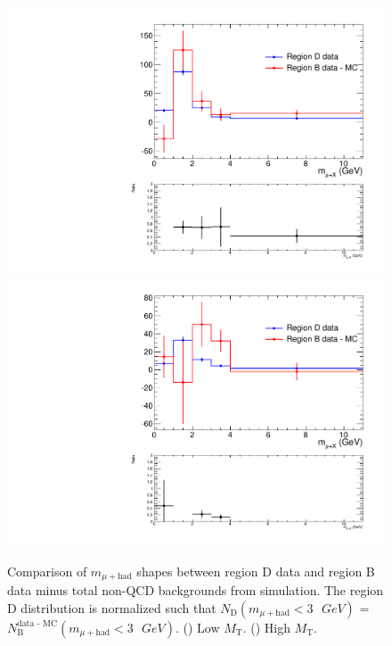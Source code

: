 \begin{figure}[hbtp]
  \begin{center}
    \includegraphics[width=\cmsFigWidth]{figures/muHadMassCanvas_regBDataMinusMCVsRegDData_lowMT}
    \includegraphics[width=\cmsFigWidth]{figures/muHadMassCanvas_regBDataMinusMCVsRegDData_highMT}
    \caption{Comparison of $m_{\mu+{\text{had}}}$ shapes between region D data and region B data minus total non-QCD backgrounds from simulation.  The region D distribution is normalized such that $N_{\text{D}}(m_{\mu+\text{had}} < 3\text{ }GeV)$ = $N_{\text{B}}^{\text{data - MC}}(m_{\mu+\text{had}} < 3\text{ }GeV)$.  (\cmsLeft) Low $M_{\text{T}}$. (\cmsRight) High $M_{\text{T}}$.}
    \label{fig:QCDComparisonBD}
  \end{center}
\end{figure}

